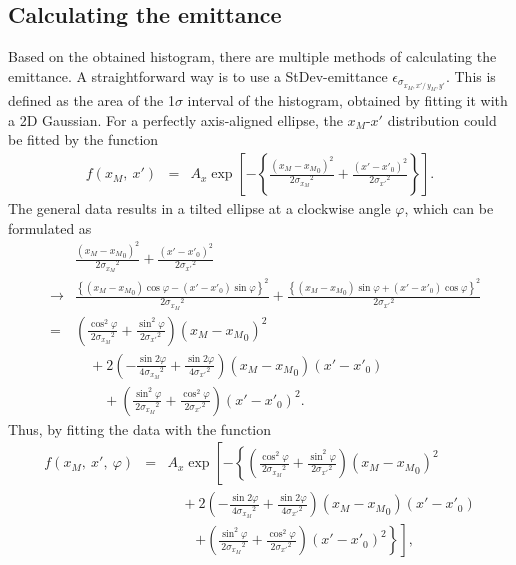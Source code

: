 \documentclass{article}
\begin{document}
\subsection{Calculating the emittance}
Based on the obtained histogram, there are multiple methods of calculating the emittance. A straightforward way is to use a StDev-emittance $\epsilon_{\sigma_{x_M,x'/\ y_M,y'}}$. This is defined as the area of the 1$\sigma$ interval of the histogram, obtained by fitting it with a 2D Gaussian. For a perfectly axis-aligned ellipse, the $x_M$-$x'$ distribution could be fitted by the function
\begin{eqnarray*}
f(x_M,\ x') & = & A_x \exp{\left[ -\left\{ \frac{\left(x_M-{x_M}_0\right)^2}{2{\sigma_{x_M}}^2} + \frac{\left(x'-{x'}_0\right)^2}{2{\sigma_{x'}}^2} \right\}\right]}.
\end{eqnarray*}
The general data results in a tilted ellipse at a clockwise angle $\varphi$, which can be formulated as
\begin{eqnarray*}
& & \frac{\left(x_M-{x_M}_0\right)^2}{2{\sigma_{x_M}}^2} + \frac{\left(x'-{x'}_0\right)^2}{2{\sigma_{x'}}^2} \\
& \rightarrow & \frac{\left\{ \left(x_M-{x_M}_0\right)\cos{\varphi} - \left(x'-{x'}_0\right)\sin{\varphi} \right\}^2}{2{\sigma_{x_M}}^2} + \frac{\left\{ \left(x_M-{x_M}_0\right)\sin{\varphi} + \left(x'-{x'}_0\right)\cos{\varphi} \right\}^2}{2{\sigma_{x'}}^2} \\
& = & \left( \frac{\cos^2{\varphi}}{2{\sigma_{x_M}}^2} + \frac{\sin^2{\varphi}}{2{\sigma_{x'}}^2} \right) \left( x_M-{x_M}_0 \right)^2 \\
& & \, \, \, \, \, \, + 2 \left( -\frac{\sin{2\varphi}}{4{\sigma_{x_M}}^2} + \frac{\sin{2\varphi}}{4{\sigma_{x'}}^2} \right) \left( x_M-{x_M}_0 \right) \left( x'-{x'}_0 \right) \\
& & \, \, \, \, \, \, \, \, \, \, \, \, + \left( \frac{\sin^2{\varphi}}{2{\sigma_{x_M}}^2} + \frac{\cos^2{\varphi}}{2{\sigma_{x'}}^2} \right) \left( x'-{x'}_0 \right)^2 .
\end{eqnarray*}
Thus, by fitting the data with the function 
\begin{eqnarray*}
f(x_M,\ x',\ \varphi) & = & A_x \exp \left[ -\left\{ \left( \frac{\cos^2{\varphi}}{2{\sigma_{x_M}}^2} + \frac{\sin^2{\varphi}}{2{\sigma_{x'}}^2} \right) \left( x_M-{x_M}_0 \right)^2 \right. \right. \\
& & \, \, \, \, \, \, + 2 \left( -\frac{\sin{2\varphi}}{4{\sigma_{x_M}}^2} + \frac{\sin{2\varphi}}{4{\sigma_{x'}}^2} \right) \left( x_M-{x_M}_0 \right) \left( x'-{x'}_0 \right) \\
& & \, \, \, \, \, \, \, \, \, \, \, \, \left. \left. + \left( \frac{\sin^2{\varphi}}{2{\sigma_{x_M}}^2} + \frac{\cos^2{\varphi}}{2{\sigma_{x'}}^2} \right) \left( x'-{x'}_0 \right)^2 \right\} \right],
\end{eqnarray*}
\end{document}
